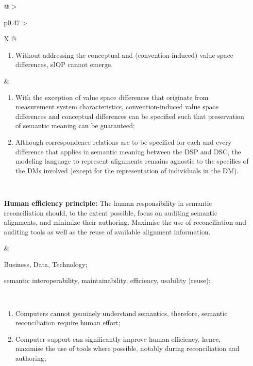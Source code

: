 \begin{xltabular}[l]{\linewidth}{@{} >{\small\raggedright\arraybackslash}p{0.47\linewidth} >{\small\raggedright\arraybackslash}X @{}}
\begin{enumerate}[left=6pt, nosep]
\begin{enumerate}
    \item distinctions between ordinal, interval and ratio scales: then the DSC is allowed to make comparisons between incomparable values, resulting in invalid pragmatic meaning;
  \end{enumerate}
  \item Without addressing the conceptual and (convention-induced) value space differences, sIOP cannot emerge.
\end{enumerate}
&
\begin{enumerate}[left=10pt, nosep]
  \item With the exception of value space differences that originate from measurement system characteristics, convention-induced value space differences and conceptual differences can be specified such that preservation of semantic meaning can be guaranteed;
  \item Although correspondence relations are to be specified for each and every difference that applies in semantic meaning between the DSP and DSC, the modeling language to represent alignments remains agnostic to the specifics of the DMs involved (except for the representation of individuals in the DM).
\end{enumerate} \\
%
%
%
\begin{mmdp}\label{dp:hep}{\bfseries Human efficiency principle:}
\quad The human responsibility in semantic reconciliation should, to the extent possible, focus on auditing semantic alignments, and minimize their authoring. Maximise the use of reconciliation and auditing tools as well as the reuse of available alignment information.\end{mmdp}
&
\begin{description}[labelwidth=3.7cm,leftmargin=3.7cm+1ex,nosep,topsep=2ex,labelsep=1ex,font=\bfseries]
\item[Type of information:] Business, Data, Technology;
\item[Quality attributes:] semantic interoperability, maintainability, efficiency, usability (reuse);
\end{description}
\\
\begin{enumerate}[left=6pt, nosep]
  \item Computers cannot genuinely understand semantics, therefore, semantic reconciliation require human effort;
  \item Computer support can significantly improve human efficiency, hence, maximise the use of tools where possible, notably during reconciliation and authoring;

\end{enumerate}
\end{xltabular}

